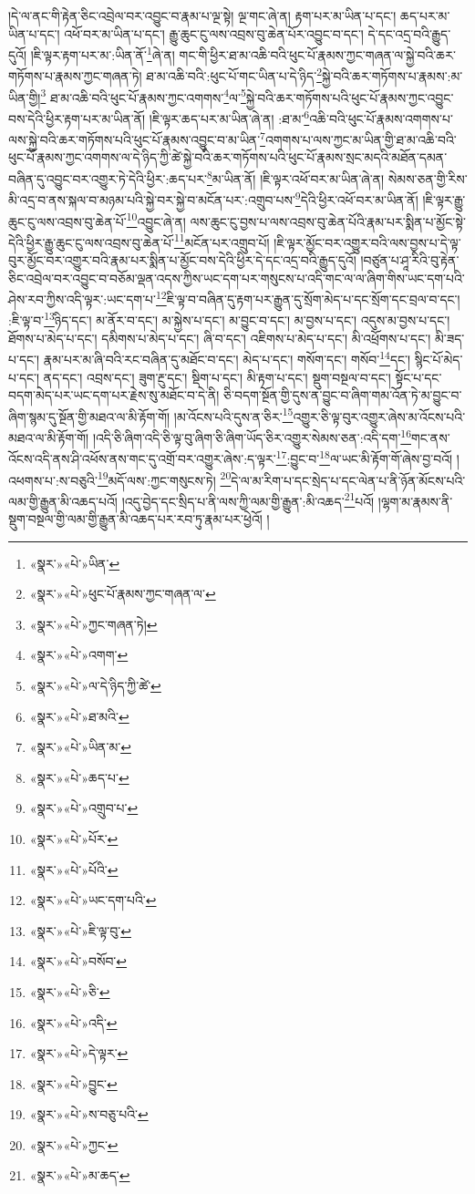 །དེ་ལ་ནང་གི་རྟེན་ཅིང་འབྲེལ་བར་འབྱུང་བ་རྣམ་པ་ལྔ་སྟེ། ལྔ་གང་ཞེ་ན། རྟག་པར་མ་ཡིན་པ་དང་། ཆད་པར་མ་ཡིན་པ་དང་། འཕོ་བར་མ་ཡིན་པ་དང་། རྒྱུ་ཆུང་ངུ་ལས་འབྲས་བུ་ཆེན་པོར་འབྱུང་བ་དང་། དེ་དང་འདྲ་བའི་རྒྱུད་དུའོ། །ཇི་ལྟར་རྟག་པར་མ་:ཡིན་ནོ་\footnote{«སྣར་»«པེ་»ཡིན་}ཞེ་ན། གང་གི་ཕྱིར་ཐ་མ་འཆི་བའི་ཕུང་པོ་རྣམས་ཀྱང་གཞན་ལ་སྐྱེ་བའི་ཆར་གཏོགས་པ་རྣམས་ཀྱང་གཞན་ཏེ། ཐ་མ་འཆི་བའི་:ཕུང་པོ་གང་ཡིན་པ་དེ་ཉིད་\footnote{«སྣར་»«པེ་»ཕུང་པོ་རྣམས་ཀྱང་གཞན་ལ་}སྐྱེ་བའི་ཆར་གཏོགས་པ་རྣམས་:མ་ཡིན་གྱི།\footnote{«སྣར་»«པེ་»ཀྱང་གཞན་ཏེ།} ཐ་མ་འཆི་བའི་ཕུང་པོ་རྣམས་ཀྱང་འགགས་\footnote{«སྣར་»«པེ་»འགག་}ལ་\footnote{«སྣར་»«པེ་»ལ་དེ་ཉིད་ཀྱི་ཚེ་}སྐྱེ་བའི་ཆར་གཏོགས་པའི་ཕུང་པོ་རྣམས་ཀྱང་འབྱུང་བས་དེའི་ཕྱིར་རྟག་པར་མ་ཡིན་ནོ། །ཇི་ལྟར་ཆད་པར་མ་ཡིན་ཞེ་ན། :ཐ་མ་\footnote{«སྣར་»«པེ་»ཐ་མའི་}འཆི་བའི་ཕུང་པོ་རྣམས་འགགས་པ་ལས་སྐྱེ་བའི་ཆར་གཏོགས་པའི་ཕུང་པོ་རྣམས་འབྱུང་བ་མ་ཡིན་\footnote{«སྣར་»«པེ་»ཡིན་མ་}འགགས་པ་ལས་ཀྱང་མ་ཡིན་གྱི་ཐ་མ་འཆི་བའི་ཕུང་པོ་རྣམས་ཀྱང་འགགས་ལ་དེ་ཉིད་ཀྱི་ཚེ་སྐྱེ་བའི་ཆར་གཏོགས་པའི་ཕུང་པོ་རྣམས་སྲང་མདའི་མཐོན་དམན་བཞིན་དུ་འབྱུང་བར་འགྱུར་ཏེ་དེའི་ཕྱིར་:ཆད་པར་\footnote{«སྣར་»«པེ་»ཆད་པ་}མ་ཡིན་ནོ། །ཇི་ལྟར་འཕོ་བར་མ་ཡིན་ཞེ་ན། སེམས་ཅན་གྱི་རིས་མི་འདྲ་བ་ནས་སྐལ་བ་མཉམ་པའི་སྐྱེ་བར་སྐྱེ་བ་མངོན་པར་:འགྲུབ་པས་\footnote{«སྣར་»«པེ་»འགྲུབ་པ་}དེའི་ཕྱིར་འཕོ་བར་མ་ཡིན་ནོ། །ཇི་ལྟར་རྒྱུ་ཆུང་ངུ་ལས་འབྲས་བུ་ཆེན་པོ་\footnote{«སྣར་»«པེ་»པོར་}འབྱུང་ཞེ་ན། ལས་ཆུང་ངུ་བྱས་པ་ལས་འབྲས་བུ་ཆེན་པོའི་རྣམ་པར་སྨིན་པ་མྱོང་སྟེ་དེའི་ཕྱིར་རྒྱུ་ཆུང་ངུ་ལས་འབྲས་བུ་ཆེན་པོ་\footnote{«སྣར་»«པེ་»པོའི་}མངོན་པར་འགྲུབ་པོ། །ཇི་ལྟར་མྱོང་བར་འགྱུར་བའི་ལས་བྱས་པ་དེ་ལྟ་བུར་མྱོང་བར་འགྱུར་བའི་རྣམ་པར་སྨིན་པ་མྱོང་བས་དེའི་ཕྱིར་དེ་དང་འདྲ་བའི་རྒྱུད་དུའོ། །བཙུན་པ་ཤཱ་རིའི་བུ་རྟེན་ཅིང་འབྲེལ་བར་འབྱུང་བ་བཅོམ་ལྡན་འདས་ཀྱིས་ཡང་དག་པར་གསུངས་པ་འདི་གང་ལ་ལ་ཞིག་གིས་ཡང་དག་པའི་ཤེས་རབ་ཀྱིས་འདི་ལྟར་:ཡང་དག་པ་\footnote{«སྣར་»«པེ་»ཡང་དག་པའི་}ཇི་ལྟ་བ་བཞིན་དུ་རྟག་པར་རྒྱུན་དུ་སྲོག་མེད་པ་དང་སྲོག་དང་བྲལ་བ་དང་། :ཇི་ལྟ་བ་\footnote{«སྣར་»«པེ་»ཇི་ལྟ་བུ་}ཉིད་དང་། མ་ནོར་བ་དང་། མ་སྐྱེས་པ་དང་། མ་བྱུང་བ་དང་། མ་བྱས་པ་དང་། འདུས་མ་བྱས་པ་དང་། ཐོགས་པ་མེད་པ་དང་། དམིགས་པ་མེད་པ་དང་། ཞི་བ་དང་། འཇིགས་པ་མེད་པ་དང་། མི་འཕྲོགས་པ་དང་། མི་ཟད་པ་དང་། རྣམ་པར་མ་ཞི་བའི་རང་བཞིན་དུ་མཐོང་བ་དང་། མེད་པ་དང་། གསོག་དང་། གསོབ་\footnote{«སྣར་»«པེ་»བསོབ་}དང་། སྙིང་པོ་མེད་པ་དང་། ནད་དང་། འབྲས་དང་། ཟུག་རྔུ་དང་། སྡིག་པ་དང་། མི་རྟག་པ་དང་། སྡུག་བསྔལ་བ་དང་། སྟོང་པ་དང་བདག་མེད་པར་ཡང་དག་པར་རྗེས་སུ་མཐོང་བ་དེ་ནི། ཅི་བདག་སྔོན་གྱི་དུས་ན་བྱུང་བ་ཞིག་གམ་འོན་ཏེ་མ་བྱུང་བ་ཞིག་སྙམ་དུ་སྔོན་གྱི་མཐའ་ལ་མི་རྟོག་གོ། །མ་འོངས་པའི་དུས་ན་ཅིར་\footnote{«སྣར་»«པེ་»ཅི་}འགྱུར་ཅི་ལྟ་བུར་འགྱུར་ཞེས་མ་འོངས་པའི་མཐའ་ལ་མི་རྟོག་གོ། །འདི་ཅི་ཞིག་འདི་ཅི་ལྟ་བུ་ཞིག་ཅི་ཞིག་ཡོད་ཅིར་འགྱུར་སེམས་ཅན་:འདི་དག་\footnote{«སྣར་»«པེ་»འདི་}གང་ནས་འོངས་འདི་ནས་ཤི་འཕོས་ནས་གང་དུ་འགྲོ་བར་འགྱུར་ཞེས་:ད་ལྟར་\footnote{«སྣར་»«པེ་»དེ་ལྟར་}:བྱུང་བ་\footnote{«སྣར་»«པེ་»བྱུང་}ལ་ཡང་མི་རྟོག་གོ་ཞེས་བྱ་བའོ། །འཕགས་པ་:ས་བཅུའི་\footnote{«སྣར་»«པེ་»ས་བཅུ་པའི་}མདོ་ལས་:ཀྱང་གསུངས་ཏེ། \footnote{«སྣར་»«པེ་»ཀྱང་}དེ་ལ་མ་རིག་པ་དང་སྲེད་པ་དང་ལེན་པ་ནི་ཉོན་མོངས་པའི་ལམ་གྱི་རྒྱུན་མི་འཆད་པའོ། །འདུ་བྱེད་དང་སྲིད་པ་ནི་ལས་ཀྱི་ལམ་གྱི་རྒྱུན་:མི་འཆད་\footnote{«སྣར་»«པེ་»མ་ཆད་}པའོ། །ལྷག་མ་རྣམས་ནི་སྡུག་བསྔལ་གྱི་ལམ་གྱི་རྒྱུན་མི་འཆད་པར་རབ་ཏུ་རྣམ་པར་ཕྱེའོ། །
